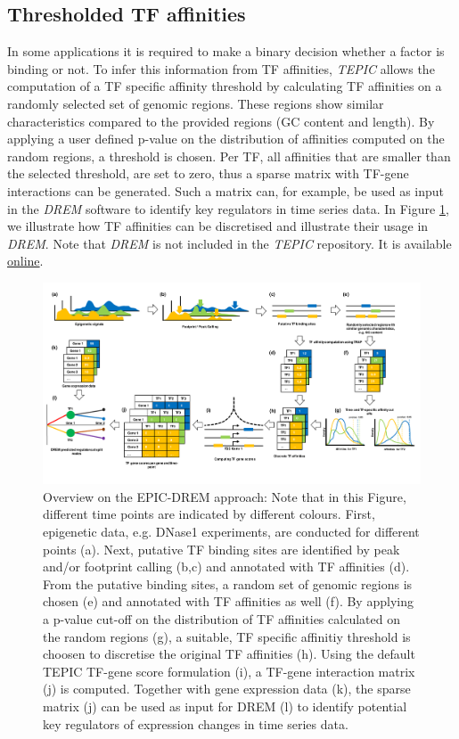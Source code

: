\documentclass{article}
\begin{document}
\subsection*{Thresholded TF affinities}
In some applications it is required to make a binary decision whether a factor is binding or not. 
To infer this information from TF affinities, \textit{TEPIC} allows the computation of a TF specific affinity threshold by calculating TF affinities on a randomly selected set of genomic regions.
These regions show similar characteristics compared to the provided regions (GC content and length). 
By applying a user defined p-value on the distribution of affinities computed on the random regions, a threshold is chosen. 
Per TF, all affinities that are smaller than the selected threshold, are set to zero, thus a sparse matrix with TF-gene interactions can be generated. 
Such a matrix can, for example, be used as input in the \textit{DREM} \cite{pmid17224918} software to identify key regulators in time series data. 
In Figure \ref{epicdrem}, we illustrate how TF affinities can be discretised and illustrate their usage in \textit{DREM}. Note that \textit{DREM}
is not included in the \textit{TEPIC} repository. It is available \href{http://www.sb.cs.cmu.edu/drem/}{online}.
\begin{figure}[h!]
\begin{center}
\includegraphics[width=\textwidth]{epicdrem.pdf}
\end{center}
\caption{Overview on the EPIC-DREM approach: Note that in this Figure, different time points are indicated by different colours. First, epigenetic data, e.g. DNase1 experiments, are conducted for different points (a).
Next, putative TF binding sites are identified by peak and/or footprint calling (b,c) and annotated with TF affinities (d). 
From the putative binding sites, a random set of genomic regions is chosen (e) and annotated with TF affinities as well (f). By applying a p-value cut-off on the distribution of TF affinities calculated on the random regions (g),
a suitable, TF specific affinitiy threshold is choosen to discretise the original TF affinities (h). Using the default TEPIC TF-gene score formulation (i), a TF-gene interaction matrix (j) is computed. Together with gene expression data (k),
the sparse matrix (j) can be used as input for DREM (l) to identify potential key regulators of expression changes in time series data.}
\label{epicdrem}
\end{figure}
\end{document}
